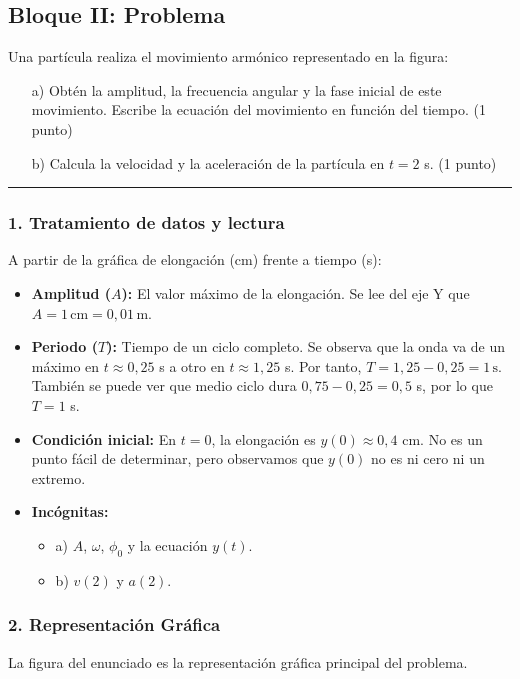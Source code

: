 \newpage

\subsection{Bloque II: Problema}
\label{subsec:A2_2011_jun_ord}

\begin{cajaenunciado}
Una partícula realiza el movimiento armónico representado en la figura:
\begin{enumerate}
    \item[a)] Obtén la amplitud, la frecuencia angular y la fase inicial de este movimiento. Escribe la ecuación del movimiento en función del tiempo. (1 punto)
    \item[b)] Calcula la velocidad y la aceleración de la partícula en $t=2$ s. (1 punto)
\end{enumerate}
\end{cajaenunciado}
\hrule

\subsubsection*{1. Tratamiento de datos y lectura}
A partir de la gráfica de elongación (cm) frente a tiempo (s):
\begin{itemize}
    \item \textbf{Amplitud ($A$):} El valor máximo de la elongación. Se lee del eje Y que $A=1\,\text{cm} = 0,01\,\text{m}$.
    \item \textbf{Periodo ($T$):} Tiempo de un ciclo completo. Se observa que la onda va de un máximo en $t \approx 0,25$ s a otro en $t \approx 1,25$ s. Por tanto, $T = 1,25 - 0,25 = 1\,\text{s}$. También se puede ver que medio ciclo dura $0,75 - 0,25 = 0,5$ s, por lo que $T=1$ s.
    \item \textbf{Condición inicial:} En $t=0$, la elongación es $y(0) \approx 0,4$ cm. No es un punto fácil de determinar, pero observamos que $y(0)$ no es ni cero ni un extremo.
    \item \textbf{Incógnitas:}
    \begin{itemize}
        \item a) $A$, $\omega$, $\phi_0$ y la ecuación $y(t)$.
        \item b) $v(2)$ y $a(2)$.
    \end{itemize}
\end{itemize}

\subsubsection*{2. Representación Gráfica}
La figura del enunciado es la representación gráfica principal del problema.


